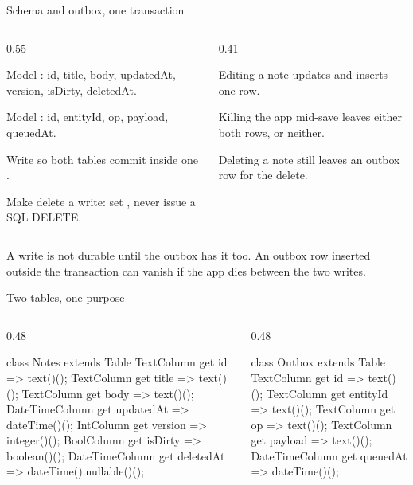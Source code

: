\documentclass[10pt,aspectratio=169,t]{beamer}
\begin{document}
\begin{frame}[eyebrow=Task I]{Schema and outbox, one transaction}
  \begin{columns}[T]
    \begin{column}{0.55\textwidth}
      \begin{steps}
        \item Model : id, title, body, updatedAt, version, isDirty, deletedAt.
        \item Model : id, entityId, op, payload, queuedAt.
        \item Write  so both tables commit inside one .
        \item Make delete a write: set , never issue a SQL DELETE.
      \end{steps}
    \end{column}
    \begin{column}{0.41\textwidth}
      \begin{checklist}
        \item Editing a note updates  and inserts one  row.
        \item Killing the app mid-save leaves either both rows, or neither.
        \item Deleting a note still leaves an outbox row for the delete.
      \end{checklist}
    \end{column}
  \end{columns}
  \begin{takeaway}{A write is not durable until the outbox has it too.}
    An outbox row inserted outside the transaction can vanish if the app dies between the two writes.
  \end{takeaway}
\end{frame}

\begin{frame}[fragile,eyebrow=Task I]{Two tables, one purpose}
  \begin{columns}[T]
    \begin{column}{0.48\textwidth}
\begin{dart}
class Notes extends Table {
  TextColumn get id => text()();
  TextColumn get title => text()();
  TextColumn get body => text()();
  DateTimeColumn get updatedAt =>
      dateTime()();
  IntColumn get version => integer()();
  BoolColumn get isDirty => boolean()();
  DateTimeColumn get deletedAt =>
      dateTime().nullable()();
}
\end{dart}
    \end{column}
    \begin{column}{0.48\textwidth}
\begin{dart}
class Outbox extends Table {
  TextColumn get id => text()();
  TextColumn get entityId => text()();
  TextColumn get op => text()();
  TextColumn get payload => text()();
  DateTimeColumn get queuedAt =>
      dateTime()();
}
\end{dart}
    \end{column}
  \end{columns}
\end{frame}
\end{document}

